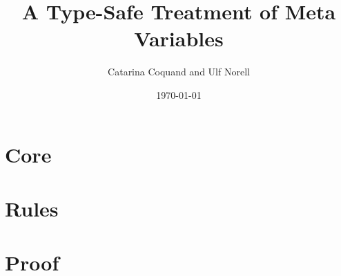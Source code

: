 \documentclass[11pt]{article}
\title{A Type-Safe Treatment of Meta Variables}
\author{Catarina Coquand and Ulf Norell}
\date{\today}
\begin{document}
\maketitle

\section{Core} 

\section{Rules} 

\section{Proof} 
\end{document}
